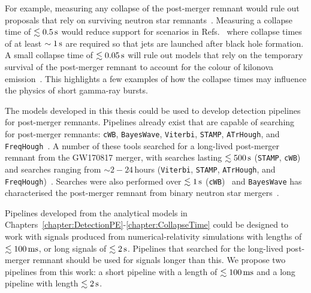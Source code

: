 \documentclass[../Thesis.tex]{subfiles}
\begin{document}
    For example, measuring any collapse of the post-merger remnant would rule out proposals that rely on surviving neutron star remnants~\cite[e.g.,][]{Yu2018}.
    Measuring a collapse time  of $\lesssim 0.5\,\mathrm{s}$ would reduce support for scenarios in Refs.~\cite{Gill2019,Murguia-Berthier2021} where collapse
    times of at least $\sim 1\,\mathrm{s}$ are required so that jets are launched after black hole formation. 
    A small collapse time of $\lesssim 0.05\,\mathrm{s}$ will rule out models that rely on the temporary survival of the post-merger remnant to account for the colour of kilonova emission~\cite{Metzger2018}.
    This highlights a few examples of how the collapse times may influence the physics of short gamma-ray bursts.\par

    The models developed in this thesis could be used to develop detection pipelines for post-merger remnants.
    Pipelines already exist that are capable of searching for post-merger remnants: \texttt{cWB}, \texttt{BayesWave}, \texttt{Viterbi}, \texttt{STAMP}, \texttt{ATrHough}, and  \texttt{FreqHough}~\cite{Thrane2011, Cornish2015,Littenberg2015,Viterbi1967,Klimenko2016, Suvorova2016,GW170817Postmerger1,Chatziioannou2017,Miller2018, Torres-Rivas2019, Oliver2019,GW170817Postmerger2}.
    A number of these tools searched for a long-lived post-merger remnant from the GW170817 merger, with searches lasting $\lesssim 500\,\mathrm{s}$ (\texttt{STAMP}, \texttt{cWB})~\cite{GW170817Postmerger1} and searches ranging from $\sim 2 - 24\,$hours (\texttt{Viterbi}, \texttt{STAMP}, \texttt{ATrHough}, and  \texttt{FreqHough})~\cite{GW170817Postmerger2}.
    Searches were also performed over $\lesssim 1\,\mathrm{s}$ (\texttt{cWB})~\cite{GW170817Postmerger1} and \texttt{BayesWave} has characterised the post-merger remnant from binary neutron star mergers~\cite{Clark2016postmerger,Chatziioannou2017,Torres-Rivas2019,Easter2020}. \par

    Pipelines developed from the analytical models in Chapters~\ref{chapter:DetectionPE}-\ref{chapter:CollapseTime} could be designed to work with signals produced from numerical-relativity simulations with lengths of $\lesssim 100\,\mathrm{ms}$, or long signals of $\lesssim 2\,\mathrm{s}$.
    Pipelines that searched for the long-lived post-merger remnant should be used for signals longer than this.
    We propose two pipelines from this work: a short pipeline with a length of $\lesssim 100\,\mathrm{ms}$ and a long pipeline with length  $\lesssim 2\,\mathrm{s}$. \par
    
\end{document}
